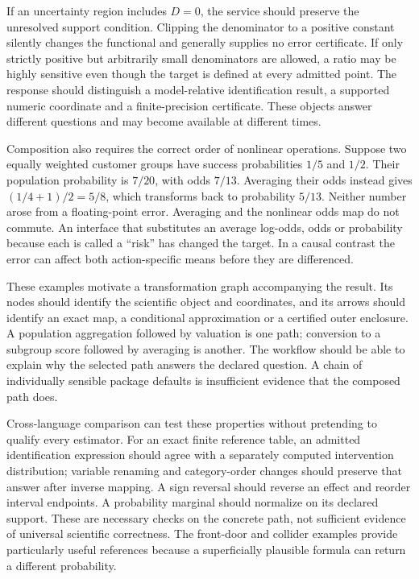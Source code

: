 If an uncertainty region includes \(D=0\), the service should preserve
the unresolved support condition. Clipping the denominator to a positive
constant silently changes the functional and generally supplies no error
certificate. If only strictly positive but arbitrarily small
denominators are allowed, a ratio may be highly sensitive even though
the target is defined at every admitted point. The response should
distinguish a model-relative identification result, a supported numeric
coordinate and a finite-precision certificate. These objects answer
different questions and may become available at different times.

Composition also requires the correct order of nonlinear operations.
Suppose two equally weighted customer groups have success probabilities
\(1/5\) and \(1/2\). Their population probability is \(7/20\), with odds
\(7/13\). Averaging their odds instead gives \((1/4+1)/2=5/8\), which
transforms back to probability \(5/13\). Neither number arose from a
floating-point error. Averaging and the nonlinear odds map do not
commute. An interface that substitutes an average log-odds, odds or
probability because each is called a ``risk'' has changed the target. In
a causal contrast the error can affect both action-specific means before
they are differenced. \citep{exec13_interchange_composition}

These examples motivate a transformation graph accompanying the result.
Its nodes should identify the scientific object and coordinates, and its
arrows should identify an exact map, a conditional approximation or a
certified outer enclosure. A population aggregation followed by
valuation is one path; conversion to a subgroup score followed by
averaging is another. The workflow should be able to explain why the
selected path answers the declared question. A chain of individually
sensible package defaults is insufficient evidence that the composed
path does.

Cross-language comparison can test these properties without pretending
to qualify every estimator. For an exact finite reference table, an
admitted identification expression should agree with a separately
computed intervention distribution; variable renaming and category-order
changes should preserve that answer after inverse mapping. A sign
reversal should reverse an effect and reorder interval endpoints. A
probability marginal should normalize on its declared support. These are
necessary checks on the concrete path, not sufficient evidence of
universal scientific correctness. The front-door and collider examples
provide particularly useful references because a superficially plausible
formula can return a different probability.


